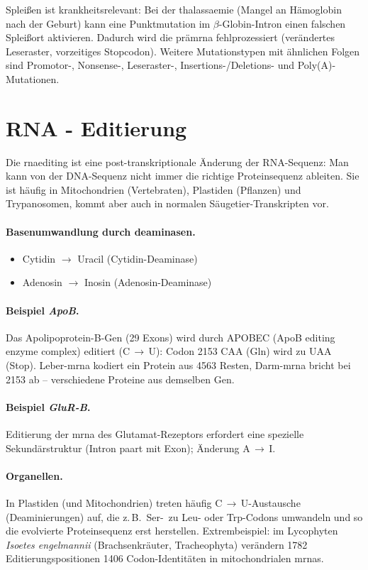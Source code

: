 Spleißen ist krankheitsrelevant: Bei der \gls{thalassaemie} (Mangel an
Hämoglobin nach der Geburt) kann eine Punktmutation im $\beta$-Globin-Intron
einen falschen Spleißort aktivieren.
Dadurch wird die \gls{prämrna}
fehlprozessiert (verändertes Leseraster, vorzeitiges Stopcodon).
Weitere
Mutationstypen mit ähnlichen Folgen sind Promotor-, Nonsense-, Leseraster-,
Insertions-/Deletions- und Poly(A)-Mutationen.


\section{RNA - Editierung}\label{sec:rna-editierung}
Die \gls{rnaediting} ist eine post-transkriptionale Änderung der
RNA-Sequenz: Man kann von der DNA-Sequenz nicht immer die richtige
Proteinsequenz ableiten.
Sie ist häufig in Mitochondrien (Vertebraten),
Plastiden (Pflanzen) und Trypanosomen, kommt aber auch in normalen
Säugetier-Transkripten vor.

\paragraph{Basenumwandlung durch \gls{deaminase}n.}
\begin{itemize}
    \item Cytidin $\to$ Uracil (Cytidin-Deaminase)
    \item Adenosin $\to$ Inosin (Adenosin-Deaminase)
\end{itemize}

\paragraph{Beispiel \emph{ApoB}.} Das Apolipoprotein-B-Gen (29 Exons) wird durch
APOBEC (ApoB editing enzyme complex) editiert (C\,$\to$\,U): Codon 2153 CAA (Gln) wird zu UAA (Stop).
Leber-\gls{mrna} kodiert ein Protein aus 4563 Resten, Darm-\gls{mrna} bricht bei 2153 ab
-- verschiedene Proteine aus demselben Gen.

\paragraph{Beispiel \emph{GluR-B}.} Editierung der \gls{mrna} des Glutamat-Rezeptors
erfordert eine spezielle Sekundärstruktur (Intron paart mit Exon); Änderung
A\,$\to$\,I\@.

\paragraph{Organellen.} In Plastiden (und Mitochondrien) treten häufig
C\,$\to$\,U-Austausche (Deaminierungen) auf, die z.\,B.\ Ser-\ zu Leu- oder
Trp-Codons umwandeln und so die evolvierte Proteinsequenz erst
herstellen.
Extrembeispiel: im Lycophyten \emph{Isoetes engelmannii}
(Brachsenkräuter, Tracheophyta) verändern 1782 Editierungspositionen 1406
Codon-Identitäten in mitochondrialen \gls{mrna}s.

